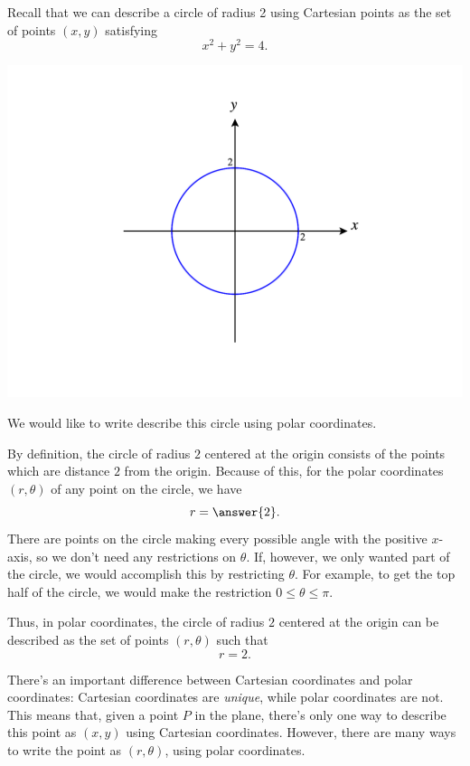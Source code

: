 \documentclass{ximera}
\begin{document}
\begin{example}
Recall that we can describe a circle of radius 2 using Cartesian points as the set of points $(x,y)$ satisfying
\[
x^2+y^2 = 4.
\]

\begin{image}
\includegraphics[width=\textwidth]{CalcPlot3D-circle_2}
\end{image}

We would like to write describe this circle using polar coordinates.

By definition, the circle of radius $2$ centered at the origin consists of the points which are distance $2$ from the origin. Because of this, for the polar coordinates $(r,\theta)$ of any point on the circle, we have
\[
r = \answer{2}.
\]
There are points on the circle making every possible angle with the positive $x$-axis, so we don't need any restrictions on $\theta$. If, however, we only wanted part of the circle, we would accomplish this by restricting $\theta$. For example, to get the top half of the circle, we would make the restriction $0\leq \theta \leq \pi$.

Thus, in polar coordinates, the circle of radius $2$ centered at the origin can be described as the set of points $(r,\theta)$ such that
\[
r = 2.
\]
\end{example}

There's an important difference between Cartesian coordinates and polar coordinates: Cartesian coordinates are \emph{unique}, while polar coordinates are not. This means that, given a point $P$ in the plane, there's only one way to describe this point as $(x,y)$ using Cartesian coordinates. However, there are many ways to write the point as $(r,\theta)$, using polar coordinates.
\end{document}
